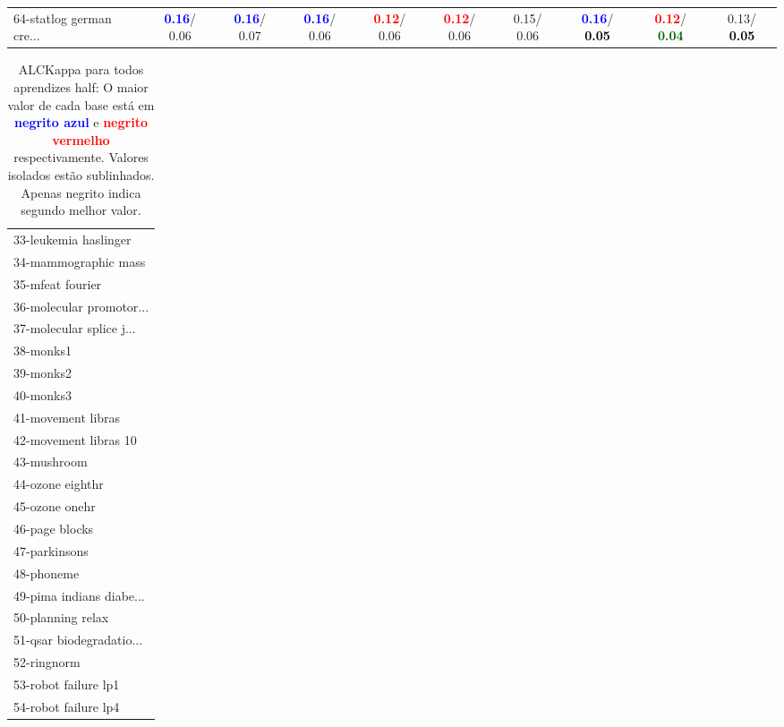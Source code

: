 \begin{table}[h]
\begin{center}
{\begin{tabular}{lc|c|c|c|c|c|c|c|c}
64-statlog german cre... & \textcolor{blue}{\textbf{  0.16}}/  0.06 & \textcolor{blue}{\textbf{  0.16}}/  0.07 & \textcolor{blue}{\textbf{  0.16}}/  0.06 & \textcolor{red}{\textbf{  0.12}}/  0.06 & \textcolor{red}{\textbf{  0.12}}/  0.06 &   0.15/  0.06 & \textcolor{blue}{\textbf{  0.16}}/\textcolor{black}{\textbf{  0.05}} & \textcolor{red}{\textbf{  0.12}}/\textcolor{darkgreen}{\textbf{  0.04}} &   0.13/\textcolor{black}{\textbf{  0.05}} \\\end{tabular}}\label{stratsALCKappa1Allalla}
\end{center}
\end{table}
\begin{table}[h]
\caption{ALCKappa para todos aprendizes half: O maior valor de cada base está em \textcolor{blue}{\textbf{negrito azul}} e \textcolor{red}{\textbf{negrito vermelho}} respectivamente. Valores isolados estão sublinhados. Apenas negrito indica segundo melhor valor.}
\begin{center}\begin{tabular}{l}
 & \\ \hline 33-leukemia haslinger &  \\
34-mammographic mass &  \\
35-mfeat fourier &  \\
36-molecular promotor... &  \\
37-molecular splice j... &  \\
38-monks1 &  \\
39-monks2 &  \\ \hline
40-monks3 &  \\
41-movement libras &  \\
42-movement libras 10 &  \\
43-mushroom &  \\
44-ozone eighthr &  \\
45-ozone onehr &  \\
46-page blocks &  \\ \hline
47-parkinsons &  \\
48-phoneme &  \\
49-pima indians diabe... &  \\
50-planning relax &  \\
51-qsar biodegradatio... &  \\
52-ringnorm &  \\
53-robot failure lp1 &  \\ \hline
54-robot failure lp4 &  \\

\end{tabular}
\end{center}
\end{table}
